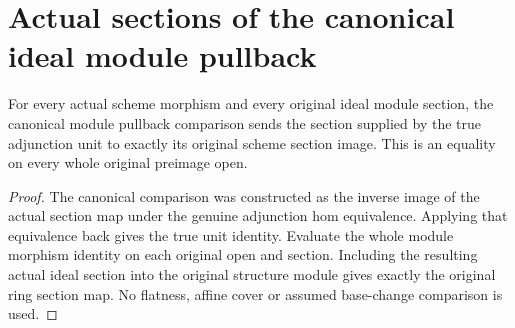 \section{Actual sections of the canonical ideal module pullback}
\begin{lemma}
\label{lem:actual-ideal-pullback-unit-sections}
\leanok
{}
For every actual scheme morphism and every original ideal module section,
the canonical module pullback comparison sends the section supplied by
the true adjunction unit to exactly its original scheme section image.
This is an equality on every whole original preimage open.
\end{lemma}
\begin{proof}
The canonical comparison was constructed as the inverse image of the
actual section map under the genuine adjunction hom equivalence.
Applying that equivalence back gives the true unit identity.
Evaluate the whole module morphism identity on each original open and
section. Including the resulting actual ideal section into the original
structure module gives exactly the original ring section map. No
flatness, affine cover or assumed base-change comparison is used.
\end{proof}
